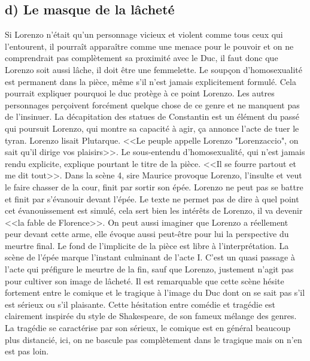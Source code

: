 \documentclass[12pt]{article}
\begin{document}
\subsection*{d) Le masque de la lâcheté}
Si Lorenzo n'était qu'un personnage vicieux et violent comme tous ceux qui l'entourent, il pourraît apparaître comme une menace pour le pouvoir et on ne comprendrait pas complètement sa proximité avec le Duc, il faut donc que Lorenzo soit aussi lâche, il doit être une femmelette.
Le soupçon d'homosexualité est permanent dans la pièce, même s'il n'est jamais explicitement formulé.
Cela pourrait expliquer pourquoi le duc protège à ce point Lorenzo.
Les autres personnages perçoivent forcément quelque chose de ce genre et ne manquent pas de l'insinuer.
La décapitation des statues de Constantin est un élément du passé qui poursuit Lorenzo, qui montre sa capacité à agir, ça annonce l'acte de tuer le tyran.
Lorenzo lisait Plutarque. <<Le peuple appelle Lorenzo "Lorenzaccio", on sait qu'il dirige vos plaisirs>>. Le sous-entendu d'homosexualité, qui n'est jamais rendu explicite, explique pourtant le titre de la pièce.
<<Il se fourre partout et me dit tout>>. Dans la scène 4, sire Maurice provoque Lorenzo, l'insulte et veut le faire chasser de la cour, finit par sortir son épée.
Lorenzo ne peut pas se battre et finit par s'évanouir devant l'épée. Le texte ne permet pas de dire à quel point cet évanouissement est simulé, cela sert bien les intérêts de Lorenzo, il va devenir <<la fable de Florence>>.
On peut aussi imaginer que Lorenzo a réellement peur devant cette arme, elle évoque aussi peut-être pour lui la perspective du meurtre final.
Le fond de l'implicite de la pièce est libre à l'interprétation.
La scène de l'épée marque l'instant culminant de l'acte I. C'est un quasi passage à l'acte qui préfigure le meurtre de la fin, sauf que Lorenzo, justement n'agit pas pour cultiver son image de lâcheté.
Il est remarquable que cette scène hésite fortement entre le comique et le tragique à l'image du Duc dont on se sait pas s'il est sérieux ou s'il plaisante.
Cette hésitation entre comédie et tragédie est clairement inspirée du style de Shakespeare, de son fameux mélange des genres. La tragédie se caractérise par son sérieux, le comique est en général beaucoup plus distancié, ici, on ne bascule pas complètement dans le tragique mais on n'en est pas loin.
\end{document}
